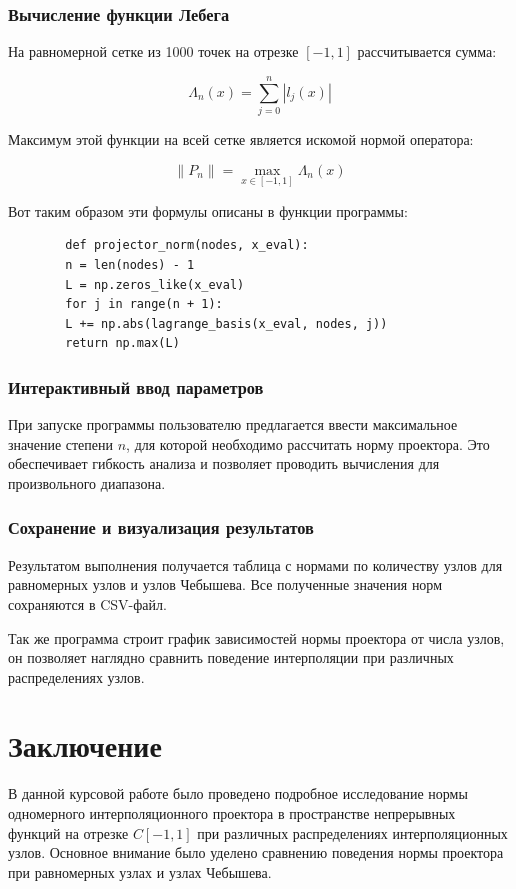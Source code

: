\documentclass[14pt,openany,a4paper,oneside]{extarticle}
\begin{document}
	\subsubsection{Вычисление функции Лебега}
	
	На равномерной сетке из 1000 точек на отрезке $[-1,1]$ рассчитывается сумма:
	
	$$\Lambda_n(x)=\sum_{j=0}^n|l_j(x)|$$
	
	Максимум этой функции на всей сетке является искомой нормой оператора:
	
	$$\|P_n\|=\max_{x\in[-1,1]}\Lambda_n(x)$$
	
	Вот таким образом эти формулы описаны в функции программы:
	\begin{verbatim}
		def projector_norm(nodes, x_eval):
		n = len(nodes) - 1
		L = np.zeros_like(x_eval)
		for j in range(n + 1):
		L += np.abs(lagrange_basis(x_eval, nodes, j))
		return np.max(L)
	\end{verbatim}
	
	\subsubsection{Интерактивный ввод параметров}
	
	При запуске программы пользователю предлагается ввести максимальное значение степени $n$, для которой необходимо рассчитать норму проектора. Это обеспечивает гибкость анализа и позволяет проводить вычисления для произвольного диапазона.
	
	\subsubsection{Сохранение и визуализация результатов}
	
	Результатом выполнения получается таблица с нормами по количеству узлов для равномерных узлов и узлов Чебышева. Все полученные значения норм сохраняются в CSV-файл.
	
	Так же программа строит график зависимостей нормы проектора от числа узлов, он позволяет наглядно сравнить поведение интерполяции при различных распределениях узлов.
	
	\newpage
	\section{Заключение}
	В данной курсовой работе было проведено подробное исследование нормы одномерного интерполяционного проектора в пространстве непрерывных функций на отрезке $C[-1,1]$ при различных распределениях интерполяционных узлов. Основное внимание было уделено сравнению поведения нормы проектора при равномерных узлах и узлах Чебышева.
	
\end{document}
